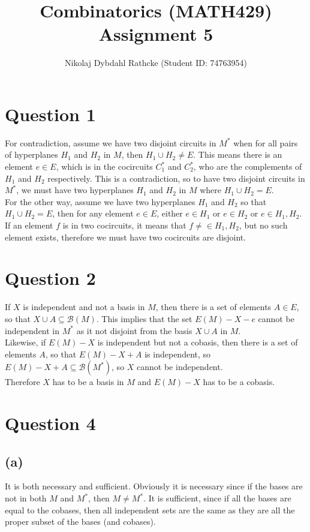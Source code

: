 \documentclass[a4paper, fleqn]{article}
\author{Nikolaj Dybdahl Rathcke (Student ID: 74763954)}
\title{Combinatorics (MATH429) \\ Assignment 5}
\begin{document}
\maketitle

\section*{Question 1}
For contradiction, assume we have two disjoint circuits in $M^*$ when for all pairs of
hyperplanes $H_1$ and $H_2$ in $M$, then $H_1 \cup H_2 \neq
E$. This means there is an element $e\in E$, which is in the cocircuits $C_1^*$ and $C_2^*$,
who are the complements of $H_1$ and $H_2$ respectively. This is a contradiction, so to
have two disjoint circuits in $M^*$, we must have two hyperplanes $H_1$ and $H_2$ in $M$
where $H_1\cup H_2=E$. \\
For the other way, assume we have two hyperplanes $H_1$ and $H_2$ so that $H_1\cup H_2 =
E$, then for any element $e\in E$, either $e\in H_1$ or $e\in H_2$ or $e\in H_1,H_2$.
If an element $f$ is in two cocircuits, it means that $f\neq\in H_1, H_2$, but no such
element exists, therefore we must have two cocircuits are disjoint.

\section*{Question 2}
If $X$ is independent and not a basis in $M$, then there is a set of elements $A\in E$, so that
$X\cup A\subseteq \mathcal{B}(M)$. This implies that the set $E(M)-X-e$ cannot be
independent in $M^*$ as it not disjoint from the basis $X\cup A$ in $M$. \\
Likewise, if $E(M)-X$ is independent but not a cobasis, then there is a set of elements
$A$, so that $E(M)-X+A$ is independent, so $E(M)-X+A\subseteq \mathcal{B}(M^*)$, so $X$ cannot be independent. \\
Therefore $X$ has to be a basis in $M$ and $E(M)-X$ has to be a cobasis.

\section*{Question 4}
\subsection*{(a)}
It is both necessary and sufficient. Obviously it is necessary since if the bases are not
in both $M$ and $M^*$, then $M\neq M^*$. It is sufficient, since if all the bases are
equal to the cobases, then all independent sets are the same as they are all the proper
subset of the bases (and cobases).
\end{document}
